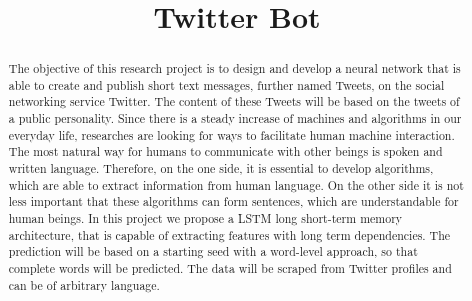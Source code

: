 \documentclass[hidelinks, conference]{IEEEtran}
\begin{document}
\title{Twitter Bot}

\author{
\and
{}
\and
{}
}

\maketitle

\begin{abstract}
The objective of this research project is to design and develop a neural network that is able to create and publish short text messages, further named Tweets, on the social networking service Twitter. The content of these Tweets will be based on the tweets of a public personality. Since there is a steady increase of machines and algorithms in our everyday life, researches are looking for ways to facilitate human machine interaction. The most natural way for humans to communicate with other beings is spoken and written language. Therefore, on the one side, it is essential to develop algorithms, which are able to extract information from human language. On the other side it is not less important that these algorithms can form sentences, which are understandable for human beings. In this project we propose a LSTM long short-term memory architecture, that is capable of extracting features with long term dependencies. The prediction will be based on a  starting seed with a word-level approach, so that complete words will be predicted. The data will be scraped from Twitter profiles and can be of arbitrary language. 
\end{abstract}
\end{document}
